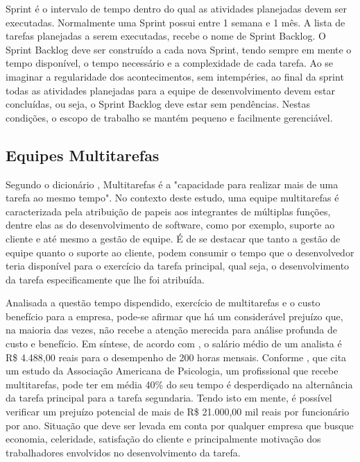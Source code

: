 Sprint é o intervalo de tempo dentro do qual as atividades planejadas devem ser executadas. Normalmente uma Sprint possui entre 1 semana e 1 mês.
A lista de tarefas planejadas a serem executadas, recebe o nome de Sprint Backlog. O Sprint Backlog deve ser construído a cada nova Sprint, tendo sempre em mente o tempo disponível, o tempo necessário e a complexidade de cada tarefa. Ao se imaginar a regularidade dos acontecimentos, sem intempéries, ao final da sprint todas as atividades planejadas para a equipe de desenvolvimento devem estar concluídas, ou seja, o Sprint Backlog deve estar sem pendências. Nestas condições, o escopo de trabalho se mantém pequeno e facilmente gerenciável.

\subsection{Equipes Multitarefas}
Segundo o dicionário , Multitarefas é a "capacidade para realizar mais de uma tarefa ao mesmo tempo". No contexto deste estudo, uma equipe multitarefas é caracterizada pela atribuição de papeis aos integrantes de múltiplas funções, dentre elas as do desenvolvimento de software, como por exemplo, suporte ao cliente e até mesmo a gestão de equipe. É de se destacar que tanto a gestão de equipe quanto o suporte ao cliente, podem consumir o tempo que o desenvolvedor teria disponível para o exercício da tarefa principal, qual seja, o desenvolvimento da tarefa especificamente  que lhe foi atribuída. \par

Analisada a questão tempo dispendido, exercício de multitarefas e o custo benefício para a empresa, pode-se afirmar que há um considerável prejuízo que, na maioria das vezes, não recebe a atenção merecida para análise profunda de custo e benefício. Em síntese, de acordo com , o salário médio de um analista é R\$ 4.488,00 reais para o desempenho de 200 horas mensais. Conforme , que cita um estudo da Associação Americana de Psicologia, um profissional que recebe multitarefas, pode ter em média 40\% do seu tempo é desperdiçado na alternância da tarefa principal para a tarefa segundaria. Tendo isto em mente, é possível verificar um prejuízo potencial de mais de R\$ 21.000,00 mil reais por funcionário por ano. Situação que deve ser levada em conta por qualquer empresa que busque economia, celeridade, satisfação do cliente e principalmente motivação dos trabalhadores envolvidos no desenvolvimento da tarefa.

